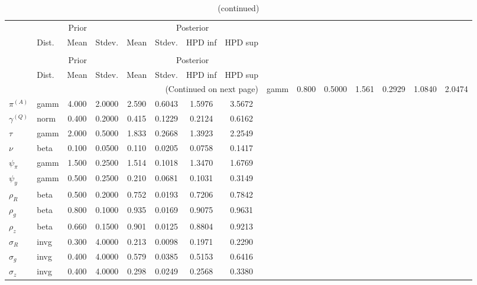  
\begin{center}
\begin{longtable}{llcccccc} 
\caption{Results from Metropolis-Hastings (parameters)}
 \label{Table:MHPosterior:1}\\
\toprule 
  & \multicolumn{3}{c}{Prior}  &  \multicolumn{4}{c}{Posterior} \\
  \cmidrule(r{.75em}){2-4} \cmidrule(r{.75em}){5-8}
  & Dist. & Mean  & Stdev. & Mean & Stdev. & HPD inf & HPD sup\\
\midrule \endfirsthead 
\caption{(continued)}\\\toprule 
  & \multicolumn{3}{c}{Prior}  &  \multicolumn{4}{c}{Posterior} \\
  \cmidrule(r{.75em}){2-4} \cmidrule(r{.75em}){5-8}
  & Dist. & Mean  & Stdev. & Mean & Stdev. & HPD inf & HPD sup\\
\midrule \endhead 
\bottomrule \multicolumn{8}{r}{(Continued on next page)} \endfoot 
\bottomrule \endlastfoot 
${r_{A}}$ & gamm &   0.800 & 0.5000 &   1.561& 0.2929 &  1.0840 &  2.0474 \\ 
${\pi^{(A)}}$ & gamm &   4.000 & 2.0000 &   2.590& 0.6043 &  1.5976 &  3.5672 \\ 
${\gamma^{(Q)}}$ & norm &   0.400 & 0.2000 &   0.415& 0.1229 &  0.2124 &  0.6162 \\ 
${\tau}$ & gamm &   2.000 & 0.5000 &   1.833& 0.2668 &  1.3923 &  2.2549 \\ 
${\nu}$ & beta &   0.100 & 0.0500 &   0.110& 0.0205 &  0.0758 &  0.1417 \\ 
${\psi_\pi}$ & gamm &   1.500 & 0.2500 &   1.514& 0.1018 &  1.3470 &  1.6769 \\ 
${\psi_y}$ & gamm &   0.500 & 0.2500 &   0.210& 0.0681 &  0.1031 &  0.3149 \\ 
${\rho_R}$ & beta &   0.500 & 0.2000 &   0.752& 0.0193 &  0.7206 &  0.7842 \\ 
${\rho_{g}}$ & beta &   0.800 & 0.1000 &   0.935& 0.0169 &  0.9075 &  0.9631 \\ 
${\rho_z}$ & beta &   0.660 & 0.1500 &   0.901& 0.0125 &  0.8804 &  0.9213 \\ 
${\sigma_R}$ & invg &   0.300 & 4.0000 &   0.213& 0.0098 &  0.1971 &  0.2290 \\ 
${\sigma_{g}}$ & invg &   0.400 & 4.0000 &   0.579& 0.0385 &  0.5153 &  0.6416 \\ 
${\sigma_z}$ & invg &   0.400 & 4.0000 &   0.298& 0.0249 &  0.2568 &  0.3380 \\ 
\end{longtable}
 \end{center}
